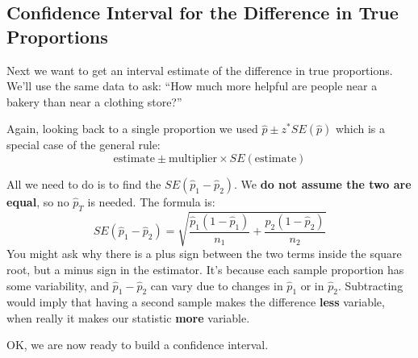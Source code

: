 \subsection{ Confidence Interval for the Difference in True Proportions}

Next we want to get an interval estimate of the difference in true
proportions.  We'll use the same data to ask: ``How much more helpful
are people near a bakery than near a clothing store?''

Again, looking back to a single proportion we used $\widehat{p} \pm
z^*SE(\widehat{p})$ which is a special case of the general rule:
$$ \mbox{estimate} \pm \mbox{multiplier} \times SE(\mbox{estimate})$$

All we need to do is to find the $SE(\widehat{p}_1 - \widehat{p}_2)$.
We {\bf do not assume the two are equal}, so no $\widehat{p}_T$ is
needed. The formula is:
  $$ SE(\widehat{p}_1 - \widehat{p}_2) = \sqrt{ 
      \frac{\widehat{p}_1(1 - \widehat{p}_1)}{n_1} + 
      \frac{\widehat{p}_2(1 - \widehat{p}_2)}{n_2}} $$
You might ask why there is a plus sign between the two terms inside
the square root, but a minus sign in the estimator.  It's because each
sample  proportion has some variability, and $\widehat{p}_1 - \widehat{p}_2 $ 
can vary due to changes in $\widehat{p}_1$ or in $\widehat{p}_2$.  Subtracting
would imply that having a second sample  makes the difference {\bf
  less} variable, when really it makes our statistic {\bf more}
variable. 

OK, we are now ready to build a confidence interval.

